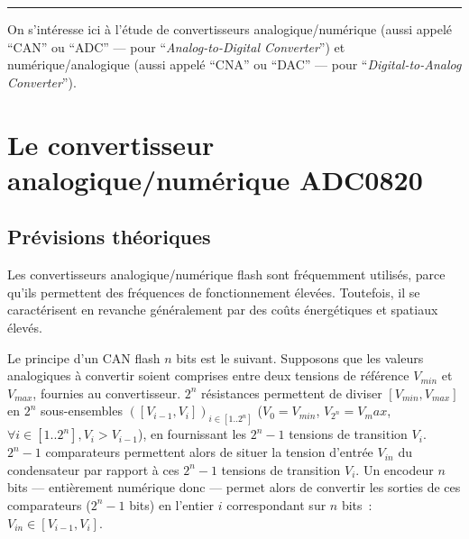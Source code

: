 \documentclass{article}
\begin{document}


\vspace{5pt}\hrule\vspace{2pt}


\vspace{20pt}


On s'intéresse ici à l'étude de convertisseurs analogique/numérique (aussi appelé ``CAN'' ou ``ADC'' --- pour ``\textit{Analog-to-Digital Converter}'') et numérique/analogique (aussi appelé ``CNA'' ou ``DAC'' --- pour ``\textit{Digital-to-Analog Converter}'').

\section{Le convertisseur analogique/numérique ADC0820}
\label{sec:ADC0820}

\subsection{Prévisions théoriques}


Les convertisseurs analogique/numérique flash sont fréquemment utilisés, %
 parce qu'ils permettent des fréquences de fonctionnement élevées. Toutefois, il se caractérisent en revanche généralement par des coûts énergétiques et spatiaux élevés.

Le principe d'un CAN flash $n$ bits est le suivant.
Supposons que les valeurs analogiques à convertir soient comprises entre deux tensions de référence $V_{min}$ et $V_{max}$, fournies au convertisseur. 
$2^n$ résistances permettent de diviser $[V_{min},V_{max}]$ en $2^n$ sous-ensembles $([V_{i-1},V_i])_{i\in[1..2^n]}$ ($V_0=V_{min}$, $V_{2^n}=V_max$, $\forall i\in[1..2^n], V_i> V_{i-1}$), en fournissant les $2^n-1$ tensions de transition $V_i$.
$2^n-1$ comparateurs permettent alors de situer la tension d'entrée $V_{in}$ du condensateur par rapport à ces $2^n-1$ tensions de transition $V_i$.
Un encodeur $n$ bits --- entièrement numérique donc --- permet alors de convertir les sorties de ces comparateurs ($2^n-1$ bits) en l'entier $i$ correspondant sur $n$ bits~: $V_{in}\in[V_{i-1},V_i]$.
\end{document}
